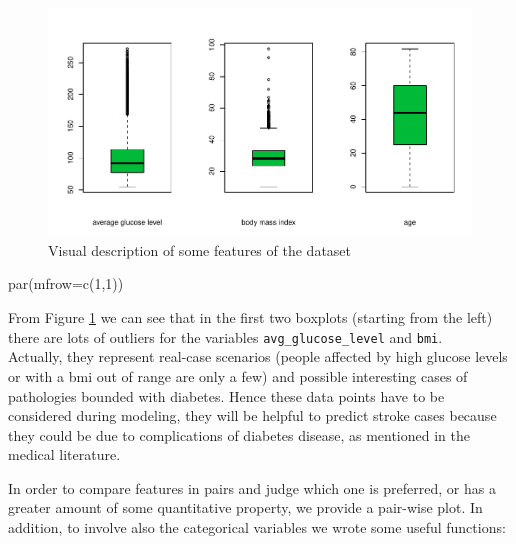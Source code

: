 \documentclass[
]{article}
\newenvironment{Shaded}{\begin{snugshade}}{\end{snugshade}}
\newcommand{\AttributeTok}[1]{\textcolor[rgb]{0.77,0.63,0.00}{#1}}
\newcommand{\DecValTok}[1]{\textcolor[rgb]{0.00,0.00,0.81}{#1}}
\newcommand{\FunctionTok}[1]{\textcolor[rgb]{0.00,0.00,0.00}{#1}}
\newcommand{\NormalTok}[1]{#1}
\begin{document}
\begin{figure}
\centering
\includegraphics{stat-project-stroke_files/figure-latex/bp-1.pdf}
\caption{\label{bp}Visual description of some features of the dataset}
\end{figure}

\begin{Shaded}
\begin{Highlighting}[]
\FunctionTok{par}\NormalTok{(}\AttributeTok{mfrow=}\FunctionTok{c}\NormalTok{(}\DecValTok{1}\NormalTok{,}\DecValTok{1}\NormalTok{))}
\end{Highlighting}
\end{Shaded}

From Figure \ref{bp} we can see that in the first two boxplots (starting
from the left) there are lots of outliers for the variables
\texttt{avg\_glucose\_level} and \texttt{bmi}.\\
Actually, they represent real-case scenarios (people affected by high
glucose levels or with a bmi out of range are only a few) and possible
interesting cases of pathologies bounded with diabetes. Hence these data
points have to be considered during modeling, they will be helpful to
predict stroke cases because they could be due to complications of
diabetes disease, as mentioned in the medical literature.

In order to compare features in pairs and judge which one is
preferred, or has a greater amount of some quantitative property, we
provide a pair-wise plot. In addition, to involve also the categorical
variables we wrote some useful functions:
\end{document}
